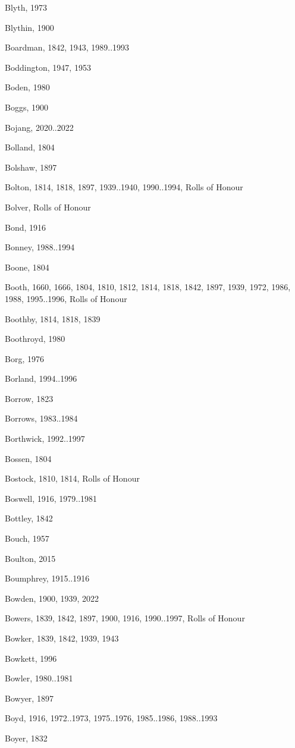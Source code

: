 \begin{theindex}
\item Blyth, 1973
\item Blythin, 1900
\item Boardman, 1842, 1943, 1989..1993
\item Boddington, 1947, 1953
\item Boden, 1980
\item Boggs, 1900
\item Bojang, 2020..2022
\item Bolland, 1804
\item Bolshaw, 1897
\item Bolton, 1814, 1818, 1897, 1939..1940, 1990..1994, Rolls of Honour
\item Bolver, Rolls of Honour
\item Bond, 1916
\item Bonney, 1988..1994
\item Boone, 1804
\item Booth, 1660, 1666, 1804, 1810, 1812, 1814, 1818, 1842, 1897, 1939, 1972, 1986, 1988, 1995..1996, Rolls of Honour
\item Boothby, 1814, 1818, 1839
\item Boothroyd, 1980
\item Borg, 1976
\item Borland, 1994..1996
\item Borrow, 1823
\item Borrows, 1983..1984
\item Borthwick, 1992..1997
\item Bossen, 1804
\item Bostock, 1810, 1814, Rolls of Honour
\item Boswell, 1916, 1979..1981
\item Bottley, 1842
\item Bouch, 1957
\item Boulton, 2015
\item Boumphrey, 1915..1916
\item Bowden, 1900, 1939, 2022
\item Bowers, 1839, 1842, 1897, 1900, 1916, 1990..1997, Rolls of Honour
\item Bowker, 1839, 1842, 1939, 1943
\item Bowkett, 1996
\item Bowler, 1980..1981
\item Bowyer, 1897
\item Boyd, 1916, 1972..1973, 1975..1976, 1985..1986, 1988..1993
\item Boyer, 1832

\end{theindex}
